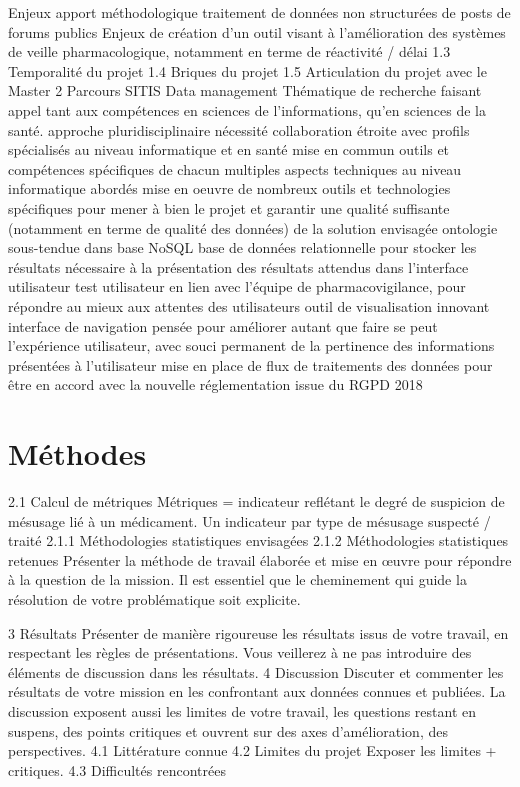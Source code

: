 \documentclass[a4paper, 11pt, openany, oneside, abstract=on]{report}
\begin{document}
Enjeux apport méthodologique traitement de données non structurées de posts de forums publics
Enjeux de création d’un outil visant à l’amélioration des systèmes de veille pharmacologique, notamment en terme de réactivité / délai
1.3 Temporalité du projet
1.4 Briques du projet
1.5 Articulation du projet avec le Master 2 Parcours SITIS
Data management
Thématique de recherche faisant appel tant aux compétences en sciences de l’informations, qu’en sciences de la santé.
approche pluridisciplinaire
nécessité collaboration étroite avec profils spécialisés au niveau informatique et en santé
mise en commun outils et compétences spécifiques de chacun
multiples aspects techniques au niveau informatique abordés
mise en oeuvre de nombreux outils et technologies spécifiques pour mener à bien le projet et garantir une qualité suffisante (notamment en terme de qualité des données) de la solution envisagée
ontologie sous-tendue dans base NoSQL
base de données relationnelle pour stocker les résultats nécessaire à la présentation des résultats attendus dans l’interface utilisateur
test utilisateur en lien avec l’équipe de pharmacovigilance, pour répondre au mieux aux attentes des utilisateurs
outil de visualisation innovant
interface de navigation pensée pour améliorer autant que faire se peut l’expérience utilisateur, avec souci permanent de la pertinence des informations présentées à l’utilisateur
mise en place de flux de traitements des données pour être en accord avec la nouvelle réglementation issue du RGPD 2018

\chapter{Méthodes}
2.1 Calcul de métriques
Métriques = indicateur reflétant le degré de suspicion de mésusage lié à un médicament.
Un indicateur par type de mésusage suspecté / traité
2.1.1 Méthodologies statistiques envisagées
2.1.2 Méthodologies statistiques retenues
Présenter la méthode de travail élaborée et mise en œuvre pour répondre à la question de la mission.
Il est essentiel que le cheminement qui guide la résolution de votre problématique soit explicite.

3 Résultats
Présenter de manière rigoureuse les résultats issus de votre travail, en respectant les règles de présentations. Vous veillerez à ne pas introduire des éléments de discussion dans les résultats.
4 Discussion
Discuter et commenter les résultats de votre mission en les confrontant aux données connues et publiées. La discussion exposent aussi les limites de votre travail, les questions restant en suspens, des points critiques et ouvrent sur des axes d’amélioration, des perspectives.
4.1 Littérature connue
4.2 Limites du projet
Exposer les limites + critiques.
4.3 Difficultés rencontrées
\end{document}
